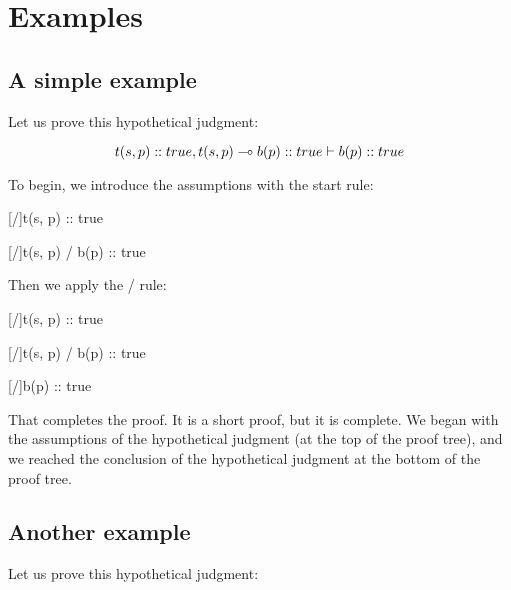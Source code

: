 \documentclass[../../../main.tex]{subfiles}
\begin{document}
\chapter{Examples}


\section{A simple example}

Let us prove this hypothetical judgment:

\begin{equation*}
  t(s, p) :: true, t(s, p) \lolli/ b(p) :: true \ndturnstile/ b(p) :: true
\end{equation*}

\noindent
To begin, we introduce the assumptions with the start rule:

\begin{prooftree*}
  \hypo{}
  [\startrule/]{t(s, p) :: true}

  \hypo{}
  [\startrule/]{t(s, p) \lolli/ b(p) :: true}
  
\end{prooftree*}

\noindent
Then we apply the \lolliElim/ rule:

\begin{prooftree*}
  \hypo{}
  [\startrule/]{t(s, p) :: true}

  \hypo{}
  [\startrule/]{t(s, p) \lolli/ b(p) :: true}
  
  [\lolliElim/]{b(p) :: true}
\end{prooftree*}

\noindent
That completes the proof. It is a short proof, but it is complete. We began with the assumptions of the hypothetical judgment (at the top of the proof tree), and we reached the conclusion of the hypothetical judgment at the bottom of the proof tree.


\section{Another example}

Let us prove this hypothetical judgment:
\end{document}
